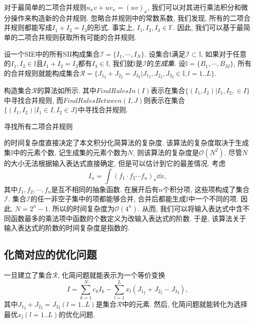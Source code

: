 对于最简单的二项合并规则$u_x v + u v_x = (uv)_x$, 我们可以对其进行乘法\D 积分和微分操作来构造新的合并规则. 忽略合并规则中的常数系数, 我们发现, 所有的二项合并规则都能写成$I_1+I_2=I_3$的形式. 事实上, $I_1,I_2,I_3\in \mathbb F$. 因此, 我们可以基于最简单的二项合并规则获取所有可能的合并规则. 

设一个SIE中的所有SII构成集合$\mathcal I =\{I_1,\cdots,I_N\}$. 设集合$\mathbb I$满足$\mathcal I \subset \mathbb I$, 如果对于任意的$I_1,I_2\in \mathbb I$且$I_1+I_2=I_3$都有$I_3\in \mathbb I$, 我们就$\mathbb I$是$\mathcal I$的\emph{生成集}. 设$\mathbb I=\{B_1,\cdots,B_M\}$, 所有的合并规则就能构成集合$\mathcal R=\{{J_1}_l+{J_2}_l={J_3}_l|{J_1}_l,{J_2}_l,{J_3}_l \in \mathbb I, l=1..L\}$.

构造集合$\mathcal R$的算法如所示. 其中$FindRulesIn(I)$表示在集合$\{(I_1,I_2)|I_1,I_2,\in I\}$中寻找合并规则, 而$FindRulesBetween(I,J)$则表示在集合$\{(I_1,I_2)|I_1\in I, I_2\in J\}$中寻找合并规则. 

\begin{algorithm}
\caption{寻找所有二项合并规则}
\label{FindAllRules}
\end{algorithm}

的时间复杂度直接决定了本文积分化简算法的复杂度. 该算法的复杂度取决于生成集$\mathbb I$中的元素个数. 记生成集的元素个数为$N$, 则该算法的复杂度是$\mathcal O(N^2)$. 尽管$N$的大小无法根据输入表达式直接确定, 但是可以估计到它的最差情况. 考虑
\begin{equation}
I_n=\int\!{(f_1\cdot f_2\cdots f_n)_x \dd x},
\label{worst_case}
\end{equation}
其中$f_1,f_2,\cdots,f_n$是互不相同的抽象函数. 在展开后有$n$个积分项, 这些项构成了集合$\mathcal I$. 集合$\mathcal I$的任一非空子集中的项都能够合并, 合并后都能生成$\mathbb I$中一个不同的项. 因此, $N=2^n-1$. 所以的时间复杂度为$\mathcal O(4^n)$. 从而, 我们可以将输入表达式中含不同函数最多的乘法项中函数的个数定义为改输入表达式的阶数. 于是, 该算法关于输入表达式的阶数的时间复杂度是指数的. 

\subsection{化简对应的优化问题}\label{optimization-03}
一旦建立了集合$\mathcal R$, 化简问题就能表示为一个等价变换
\begin{equation}
I=\sum_{k=1}^N{c_k I_k}-\sum_{l=1}^L{x_l ({J_1}_l+{J_2}_l-{J_3}_l)},
\label{normal_simplify}
\end{equation}
其中${J_1}_l+{J_2}_l={J_3}_l(l=1..L)$是集合$\mathcal R$中的元素. 然后, 化简问题就能转化为选择最优$x_l(l=1..L)$的优化问题.

